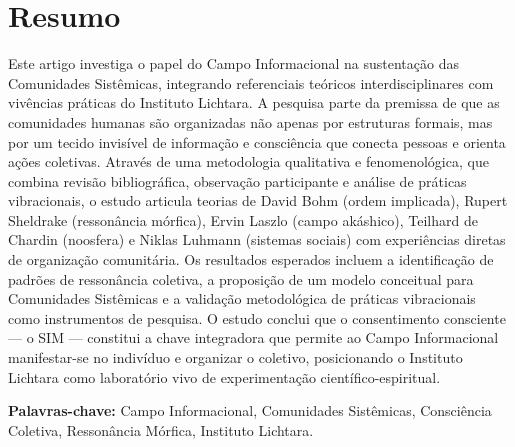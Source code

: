 \section*{Resumo}

Este artigo investiga o papel do Campo Informacional na sustentação das Comunidades Sistêmicas, integrando referenciais teóricos interdisciplinares com vivências práticas do Instituto Lichtara. A pesquisa parte da premissa de que as comunidades humanas são organizadas não apenas por estruturas formais, mas por um tecido invisível de informação e consciência que conecta pessoas e orienta ações coletivas. Através de uma metodologia qualitativa e fenomenológica, que combina revisão bibliográfica, observação participante e análise de práticas vibracionais, o estudo articula teorias de David Bohm (ordem implicada), Rupert Sheldrake (ressonância mórfica), Ervin Laszlo (campo akáshico), Teilhard de Chardin (noosfera) e Niklas Luhmann (sistemas sociais) com experiências diretas de organização comunitária. Os resultados esperados incluem a identificação de padrões de ressonância coletiva, a proposição de um modelo conceitual para Comunidades Sistêmicas e a validação metodológica de práticas vibracionais como instrumentos de pesquisa. O estudo conclui que o consentimento consciente — o SIM — constitui a chave integradora que permite ao Campo Informacional manifestar-se no indivíduo e organizar o coletivo, posicionando o Instituto Lichtara como laboratório vivo de experimentação científico-espiritual.

\textbf{Palavras-chave:} Campo Informacional, Comunidades Sistêmicas, Consciência Coletiva, Ressonância Mórfica, Instituto Lichtara.

\newpage
